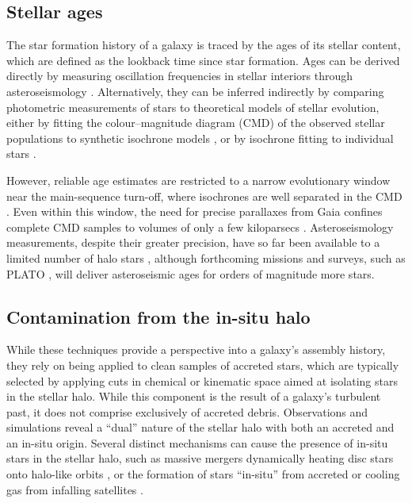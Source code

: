 \subsection{Stellar ages}

The star formation history of a galaxy is traced by the ages of its stellar content, which are defined as the 
lookback time since star formation. Ages can be derived directly by measuring 
oscillation frequencies in stellar interiors through asteroseismology \citep{Montalban2021}. Alternatively,
they can be inferred indirectly by comparing photometric measurements of stars to theoretical models 
of stellar evolution,
either by fitting the colour--magnitude diagram (CMD) of the observed stellar populations to synthetic 
isochrone models \citep{Gallart2019,Gallart2024}, or by isochrone fitting to 
individual stars \citep{Woody2025}. 

However, reliable age estimates are restricted to a narrow evolutionary window near the
main-sequence turn-off, where isochrones are well separated in the CMD \citep{Woody2025}. 
Even within this window, the need for precise parallaxes from Gaia confines complete CMD samples to volumes of only
a few kiloparsecs \citep{Gallart2019,Woody2025}. Asteroseismology measurements, despite their greater precision, 
have so far been available to a limited number of halo stars \citep{Montalban2021}, although forthcoming missions
and surveys, such as PLATO \citep{Miglio2017}, will deliver asteroseismic ages for orders of magnitude more
stars.

\subsection{Contamination from the in-situ halo}

While these techniques provide a perspective into a galaxy's assembly history, they rely on being applied to 
clean samples of accreted stars, which are typically selected by applying cuts in chemical or kinematic space 
aimed at isolating stars in the stellar halo. While this component is the result of a galaxy's turbulent past, it does
not comprise exclusively of accreted debris. Observations \citep{Carollo2007,Carollo2010,Beers2012} and simulations \citep{Zolotov2009,Cooper2015} 
reveal a ``dual'' nature of the stellar halo with both an accreted and an in-situ origin. Several distinct mechanisms 
can cause the presence of in-situ stars in the stellar halo, such as massive mergers dynamically heating disc stars
onto halo-like orbits \citep{Belokurov2020,Mackereth2019a}, or the formation of stars ``in-situ''
from accreted or cooling gas from infalling satellites \citep{Zolotov2009,Font2011,Cooper2015}. 


